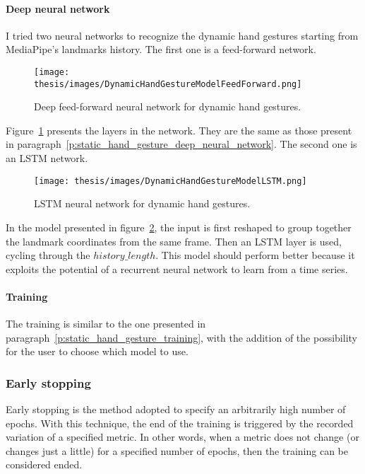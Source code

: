 \documentclass[../thesis.tex]{subfiles}
\begin{document}
\paragraph{Deep neural network}
I tried two neural networks to recognize the dynamic hand gestures starting from MediaPipe's landmarks history. The first one is a feed-forward network.
\begin{figure}[H]
    \centering
    \texttt{[image: thesis/images/DynamicHandGestureModelFeedForward.png]}
    \caption{Deep feed-forward neural network for dynamic hand gestures.}
    \label{fig:ff_model_dynamic_hand_gestures}
\end{figure}
Figure~\ref{fig:ff_model_dynamic_hand_gestures} presents the layers in the network.  They are the same as those present in paragraph~\ref{p:static_hand_gesture_deep_neural_network}.
The second one is an \acrshort{LSTM} network.
\begin{figure}[H]
    \centering
    \texttt{[image: thesis/images/DynamicHandGestureModelLSTM.png]}
    \caption{\acrshort{LSTM} neural network for dynamic hand gestures.}
    \label{fig:lstm_model_dynamic_hand_gestures}
\end{figure}
In the model presented in figure~\ref{fig:lstm_model_dynamic_hand_gestures}, the input is first reshaped to group together the landmark coordinates from the same frame. Then an LSTM layer is used, cycling through the  $history\_length$. This model should perform better because it exploits the potential of a recurrent neural network to learn from a time series.

\paragraph{Training}
The training is similar to the one presented in paragraph~\ref{p:static_hand_gesture_training}, with the addition of the possibility for the user to choose which model to use.

\subsubsection{Early stopping}
Early stopping is the method adopted to specify an arbitrarily high number of epochs. With this technique, the end of the training is triggered by the recorded variation of a specified metric. In other words, when a metric does not change (or changes just a little) for a specified number of epochs, then the training can be considered ended.\\
\end{document}
